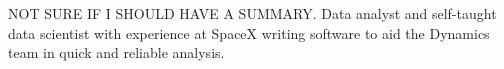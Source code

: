 

\begin{cvparagraph}

NOT SURE IF I SHOULD HAVE A SUMMARY. Data analyst and self-taught data scientist with experience at SpaceX writing software to aid the Dynamics team in quick and reliable analysis. 
\end{cvparagraph}
